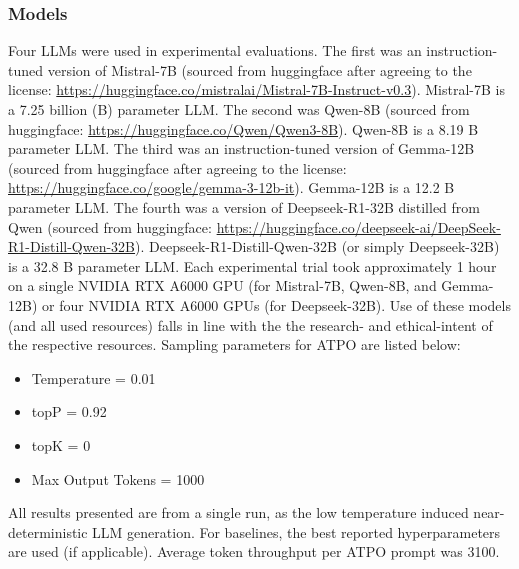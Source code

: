 \subsubsection{Models}
Four LLMs were used in experimental evaluations. 
The first was an instruction-tuned version of Mistral-7B \cite{jiang2023mistral7b} (sourced from huggingface after agreeing to the license: \url{https://huggingface.co/mistralai/Mistral-7B-Instruct-v0.3}). Mistral-7B is a 7.25 billion (B) parameter LLM. The second was Qwen-8B \cite{qwen3technicalreport} (sourced from huggingface: \url{https://huggingface.co/Qwen/Qwen3-8B}). Qwen-8B is a 8.19 B parameter LLM. The third was an instruction-tuned version of Gemma-12B \cite{team2025gemma} (sourced from huggingface after agreeing to the license: \url{https://huggingface.co/google/gemma-3-12b-it}). Gemma-12B is a 12.2 B parameter LLM. The fourth was a version of Deepseek-R1-32B distilled from Qwen \cite{guo2025deepseek} (sourced from huggingface: \url{https://huggingface.co/deepseek-ai/DeepSeek-R1-Distill-Qwen-32B}). Deepseek-R1-Distill-Qwen-32B (or simply Deepseek-32B) is a 32.8 B parameter LLM. Each experimental trial took approximately 1 hour on a single NVIDIA RTX A6000 GPU (for Mistral-7B, Qwen-8B, and Gemma-12B) or four NVIDIA RTX A6000 GPUs (for Deepseek-32B). Use of these models (and all used resources) falls in line with the the research- and ethical-intent of the respective resources. Sampling parameters for ATPO are listed below:
\begin{itemize}
    \item Temperature = 0.01
    \item topP = 0.92
    \item topK = 0
    \item Max Output Tokens = 1000
\end{itemize}
All results presented are from a single run, as the low temperature induced near-deterministic LLM generation. For baselines, the best reported hyperparameters are used (if applicable). Average token throughput per ATPO prompt was 3100.

